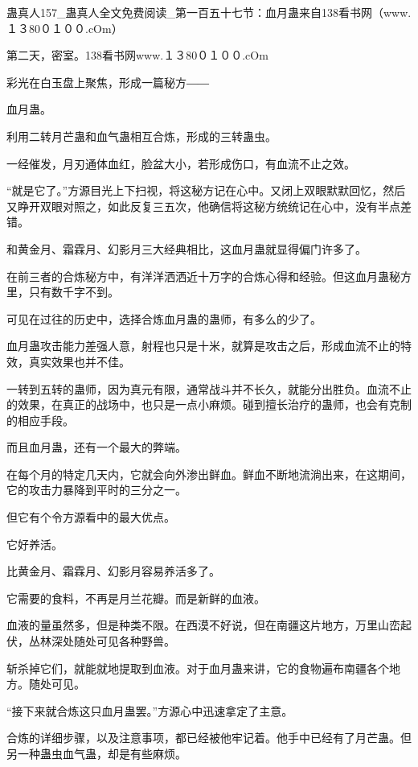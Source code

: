 
\begin{this_body}

蛊真人157\_蛊真人全文免费阅读\_第一百五十七节：血月蛊来自138看书网（www.１３80０１００.cOm）

第二天，密室。138看书网www.１３80０１００.cOm

彩光在白玉盘上聚焦，形成一篇秘方――

血月蛊。

利用二转月芒蛊和血气蛊相互合炼，形成的三转蛊虫。

一经催发，月刃通体血红，脸盆大小，若形成伤口，有血流不止之效。

“就是它了。”方源目光上下扫视，将这秘方记在心中。又闭上双眼默默回忆，然后又睁开双眼对照之，如此反复三五次，他确信将这秘方统统记在心中，没有半点差错。

和黄金月、霜霖月、幻影月三大经典相比，这血月蛊就显得偏门许多了。

在前三者的合炼秘方中，有洋洋洒洒近十万字的合炼心得和经验。但这血月蛊秘方里，只有数千字不到。

可见在过往的历史中，选择合炼血月蛊的蛊师，有多么的少了。

血月蛊攻击能力差强人意，射程也只是十米，就算是攻击之后，形成血流不止的特效，真实效果也并不佳。

一转到五转的蛊师，因为真元有限，通常战斗并不长久，就能分出胜负。血流不止的效果，在真正的战场中，也只是一点小麻烦。碰到擅长治疗的蛊师，也会有克制的相应手段。

而且血月蛊，还有一个最大的弊端。

在每个月的特定几天内，它就会向外渗出鲜血。鲜血不断地流淌出来，在这期间，它的攻击力暴降到平时的三分之一。

但它有个令方源看中的最大优点。

它好养活。

比黄金月、霜霖月、幻影月容易养活多了。

它需要的食料，不再是月兰花瓣。而是新鲜的血液。

血液的量虽然多，但是种类不限。在西漠不好说，但在南疆这片地方，万里山峦起伏，丛林深处随处可见各种野兽。

斩杀掉它们，就能就地提取到血液。对于血月蛊来讲，它的食物遍布南疆各个地方。随处可见。

“接下来就合炼这只血月蛊罢。”方源心中迅速拿定了主意。

合炼的详细步骤，以及注意事项，都已经被他牢记着。他手中已经有了月芒蛊。但另一种蛊虫血气蛊，却是有些麻烦。


\end{this_body}
